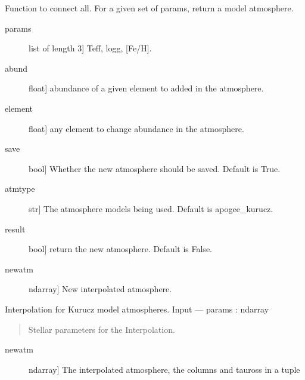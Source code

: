 \documentclass[letterpaper,10pt,english]{sphinxmanual}
\begin{document}
\begin{fulllineitems}
\label{\detokenize{index:FASMA.interpolation.interpolator}}
Function to connect all. For a given set of params, return a model atmosphere.
\begin{description}
\item[{params}] \leavevmode{[}list of length 3{]}
Teff, logg, {[}Fe/H{]}.

\item[{abund}] \leavevmode{[}float{]}
abundance of a given element to added in the atmosphere.

\item[{element}] \leavevmode{[}float{]}
any element to change abundance in the atmosphere.

\item[{save}] \leavevmode{[}bool{]}
Whether the new atmosphere should be saved. Default is True.

\item[{atmtype}] \leavevmode{[}str{]}
The atmosphere models being used. Default is apogee\_kurucz.

\item[{result}] \leavevmode{[}bool{]}
return the new atmosphere. Default is False.

\end{description}
\begin{description}
\item[{newatm}] \leavevmode{[}ndarray{]}
New interpolated atmosphere.

\end{description}

\end{fulllineitems}


\begin{fulllineitems}
\label{\detokenize{index:FASMA.interpolation.interpolator_kurucz}}
Interpolation for Kurucz model atmospheres.
Input
—\textendash{}
params : ndarray
\begin{quote}

Stellar parameters for the Interpolation.
\end{quote}
\begin{description}
\item[{newatm}] \leavevmode{[}ndarray{]}
The interpolated atmosphere, the columns and tauross in a tuple

\end{description}

\end{fulllineitems}
\end{document}
